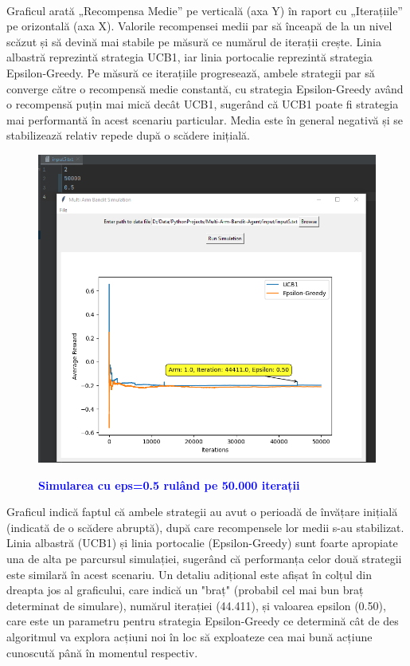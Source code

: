 \documentclass{article}
\begin{document}
\\Graficul arată „Recompensa Medie” pe verticală (axa Y) în raport cu „Iterațiile” pe orizontală (axa X). Valorile recompensei medii par să înceapă de la un nivel scăzut și să devină mai stabile pe măsură ce numărul de iterații crește. Linia albastră reprezintă strategia UCB1, iar linia portocalie reprezintă strategia Epsilon-Greedy. Pe măsură ce iterațiile progresează, ambele strategii par să converge către o recompensă medie constantă, cu strategia Epsilon-Greedy având o recompensă puțin mai mică decât UCB1, sugerând că UCB1 poate fi strategia mai performantă în acest scenariu particular. Media este în general negativă  și se stabilizează relativ repede după o scădere inițială.\\
\newpage
\begin{figure}[h]
    \centering
    \includegraphics[width=1\linewidth]{plot generation 2.png}
    \bfseries\caption{\textcolor{blue}{\textbf{Simularea cu eps=0.5 rulând pe 50.000 iterații}}}
\end{figure}
Graficul indică faptul că ambele strategii au avut o perioadă de învățare inițială (indicată de o scădere abruptă), după care recompensele lor medii s-au stabilizat. Linia albastră (UCB1) și linia portocalie (Epsilon-Greedy) sunt foarte apropiate una de alta pe parcursul simulației, sugerând că performanța celor două strategii este similară în acest scenariu.
Un detaliu adițional este afișat în colțul din dreapta jos al graficului, care indică un "braț" (probabil cel mai bun braț determinat de simulare), numărul iterației (44.411), și valoarea epsilon (0.50), care este un parametru pentru strategia Epsilon-Greedy ce determină cât de des algoritmul va explora acțiuni noi în loc să exploateze cea mai bună acțiune cunoscută până în momentul respectiv.
\end{document}
